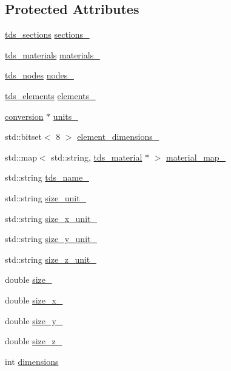 \subsection*{Protected Attributes}
\begin{DoxyCompactItemize}
\item 
\hyperlink{tds__parts_8hh_aef503d0ac251112b915fc3a8918962f2}{tds\+\_\+sections} \hyperlink{classtds_aea3487dc26061f4f2fe815bc06bf8e8d}{sections\+\_\+}
\item 
\hyperlink{tds__parts_8hh_a972ae401709b50fd79befb06dd952170}{tds\+\_\+materials} \hyperlink{classtds_a67a9a18e5abe34aa5949862feb142468}{materials\+\_\+}
\item 
\hyperlink{tds__parts_8hh_ad445cf91d41fc0e37fcaf259adec00ef}{tds\+\_\+nodes} \hyperlink{classtds_a17991ace2c272d964099042862178d8d}{nodes\+\_\+}
\item 
\hyperlink{tds__parts_8hh_af35ca3b18f7ed6e38a9bfb5639d5a23e}{tds\+\_\+elements} \hyperlink{classtds_ae68472e797b37e20ac491ac8e6b5b911}{elements\+\_\+}
\item 
\hyperlink{classconversion}{conversion} $\ast$ \hyperlink{classtds_a995cf6b41f841a319beee5956ee3092a}{units\+\_\+}
\item 
std\+::bitset$<$ 8 $>$ \hyperlink{classtds_ae110d4c4170a9197aaac3de482dfd3df}{element\+\_\+dimensions\+\_\+}
\item 
std\+::map$<$ std\+::string, \hyperlink{classtds__material}{tds\+\_\+material} $\ast$ $>$ \hyperlink{classtds_a84e25b033be5370a9ebf8446af204189}{material\+\_\+map\+\_\+}
\item 
std\+::string \hyperlink{classtds_a81d050e8f4824b068943233983a18c72}{tds\+\_\+name\+\_\+}
\item 
std\+::string \hyperlink{classtds_ae8e6d5fc35c262760343c8ab7e5544f7}{size\+\_\+unit\+\_\+}
\item 
std\+::string \hyperlink{classtds_a95fdcbfe8def753d955fbc877aaa6e7e}{size\+\_\+x\+\_\+unit\+\_\+}
\item 
std\+::string \hyperlink{classtds_a8d15dd98b3afae8f6dc2d10da81b4822}{size\+\_\+y\+\_\+unit\+\_\+}
\item 
std\+::string \hyperlink{classtds_a01eaf6d0f842d03707ede1d581679665}{size\+\_\+z\+\_\+unit\+\_\+}
\item 
double \hyperlink{classtds_a10d8009264fbbdf6e1f251126c95722b}{size\+\_\+}
\item 
double \hyperlink{classtds_abaf62143b01769f22bfe00a06b208499}{size\+\_\+x\+\_\+}
\item 
double \hyperlink{classtds_a3d5ebc44c474eba100d5889d6e61596e}{size\+\_\+y\+\_\+}
\item 
double \hyperlink{classtds_a89da6f5b2a584866959d10d491b36c44}{size\+\_\+z\+\_\+}
\item 
int \hyperlink{classtds_ac48ac015df4afa958eac52682954802c}{dimensions}
\end{DoxyCompactItemize}


